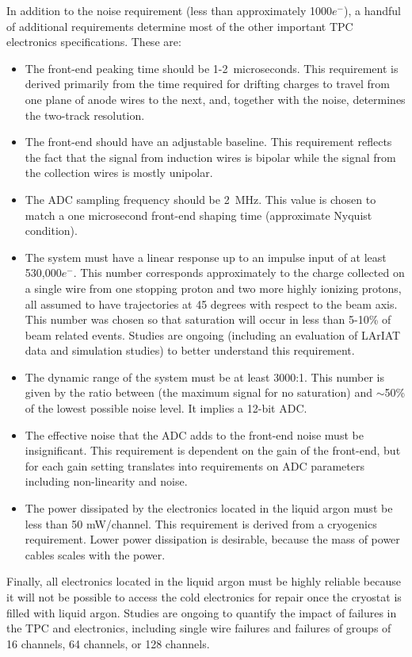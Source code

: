 In addition to the noise requirement (less than approximately 1000$e^{-}$), a handful of additional requirements determine most of the other important TPC electronics specifications.  These are:

\begin{itemize}
\item{The front-end peaking time should be 1-2~microseconds.  This requirement is derived primarily from the time required for drifting charges to travel from one plane of anode wires to the next, and, together with the noise, determines the two-track resolution.}
\item{The front-end should have an adjustable baseline.  This requirement reflects the fact that the signal from induction wires is bipolar while the signal from the collection wires is mostly unipolar.}
\item{The ADC sampling frequency should be 2~MHz.  This value is chosen to match a one microsecond front-end shaping time (approximate Nyquist condition).}
\item{The system must have a linear response up to an impulse input of at least 530,000$e^{-}$.  This number corresponds approximately to the charge collected on a single wire from one stopping proton and two more highly ionizing protons, all assumed to have trajectories at 45 degrees with respect to the beam axis.  This number was chosen so that saturation will occur in less than 5-10\% of beam related events.  Studies are ongoing (including an evaluation of LArIAT data and simulation studies) to better understand this requirement.}
\item{The dynamic range of the system must be at least 3000:1. This number is given by the ratio between (the maximum signal for no saturation) and $\sim$50\% of the lowest possible noise level.  It implies a 12-bit ADC.}
\item{The effective noise that the ADC adds to the front-end noise must be insignificant.  This requirement is dependent on the gain of the front-end, but for each gain setting translates into requirements on ADC parameters including non-linearity and noise.}
\item{The power dissipated by the electronics located in the liquid argon must be less than 50 mW/channel.  This requirement is derived from a cryogenics requirement.  Lower power dissipation is desirable, because the mass of power cables scales with the power.}
\end{itemize}

Finally, all electronics located in the liquid argon must be highly reliable because it will not be possible to access the cold electronics for repair once the cryostat is filled with liquid argon.  Studies are ongoing to quantify the impact of failures in the TPC and electronics, including single wire failures and failures of groups of 16 channels, 64 channels, or 128 channels.

